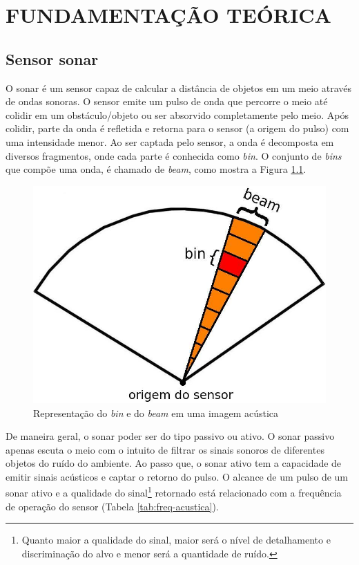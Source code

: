 \chapter{FUNDAMENTAÇÃO TEÓRICA}
\label{chap:fundamentacaoTeorica}


\section{Sensor sonar}
\label{sec:sonar}

O sonar é um sensor capaz de calcular a distância de objetos em um meio através de ondas sonoras. 
O sensor emite um pulso de onda que percorre o meio até colidir em um obstáculo/objeto ou ser absorvido completamente pelo meio. 
Após colidir, parte da onda é refletida e retorna para o sensor (a origem do pulso) com uma intensidade menor. 
Ao ser captada pelo sensor, a onda é decomposta em diversos fragmentos, onde cada parte é conhecida como \textit{bin}. O conjunto de \textit{bins} que compõe uma onda, é chamado de \textit{beam}, como mostra a Figura \ref{fig:imagem_acustica}.

\begin{figure}[H]
    \centering
    \includegraphics[scale=0.4]{dados/figuras/imagem_acustica.jpg}
    \caption{Representação do \textit{bin} e do \textit{beam} em uma imagem acústica}
    \label{fig:imagem_acustica}
\end{figure}

De maneira geral, o sonar poder ser do tipo passivo ou ativo. O sonar passivo apenas escuta o meio com o intuito de filtrar os sinais sonoros de diferentes objetos do ruído do ambiente. Ao passo que, o sonar ativo tem a capacidade de emitir sinais acústicos e captar o retorno do pulso. O alcance de um pulso de um sonar ativo e a qualidade do sinal\footnote{Quanto maior a qualidade do sinal, maior será o nível de detalhamento e discriminação do alvo e menor será a quantidade de ruído.} retornado está relacionado com a frequência de operação do sensor (Tabela \ref{tab:freq-acustica}).

